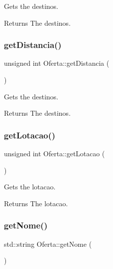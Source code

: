 Gets the destinos. 

\begin{DoxyReturn}{Returns}
The destinos. 
\end{DoxyReturn}
\mbox{\label{classOferta_a0d07f80f25f4fb21c0819c3e25d67fb9}} 
\subsubsection{\texorpdfstring{get\+Distancia()}{getDistancia()}}
{\footnotesize\ttfamily unsigned int Oferta\+::get\+Distancia (\begin{DoxyParamCaption}{ }\end{DoxyParamCaption})\hspace{0.3cm}{\ttfamily [inline]}}



Gets the destinos. 

\begin{DoxyReturn}{Returns}
The destinos. 
\end{DoxyReturn}
\mbox{\label{classOferta_a9c8fbec401e54e590828209931bf25b0}} 
\subsubsection{\texorpdfstring{get\+Lotacao()}{getLotacao()}}
{\footnotesize\ttfamily unsigned int Oferta\+::get\+Lotacao (\begin{DoxyParamCaption}{ }\end{DoxyParamCaption})\hspace{0.3cm}{\ttfamily [inline]}}



Gets the lotacao. 

\begin{DoxyReturn}{Returns}
The lotacao. 
\end{DoxyReturn}
\mbox{\label{classOferta_a16da38d9f369b000cb544c34200707b8}} 
\subsubsection{\texorpdfstring{get\+Nome()}{getNome()}}
{\footnotesize\ttfamily std\+::string Oferta\+::get\+Nome (\begin{DoxyParamCaption}{ }\end{DoxyParamCaption})\hspace{0.3cm}{\ttfamily [inline]}}



